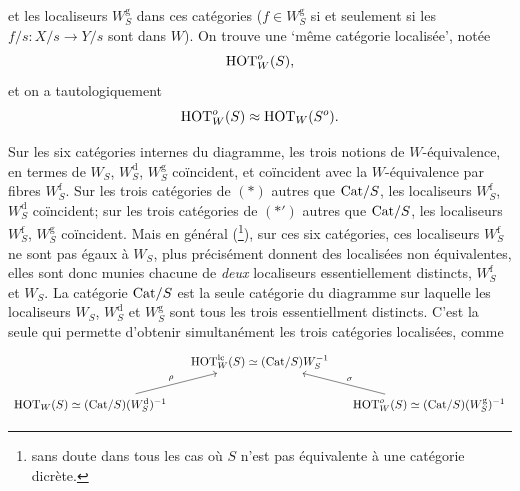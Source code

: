 \dgrchunkbegin

\setcounter{footnote}{45}

et les localiseurs $W_S^{\mathrm{g}}$ dans ces catégories ($f\in W_S^{\mathrm{g}}$ si et seulement si les $f/s : X/s\longrightarrow Y/s$ sont dans $W$). On trouve une `même catégorie localisée', notée
\[ \mathrm{HOT}^o_W(S), \]
et on a tautologiquement
\[ \mathrm{HOT}^o_W(S)\approx\mathrm{HOT}_W(S^o). \]


\quad Sur les six catégories internes du diagramme, les trois notions de $W$-équivalence, en termes de $W_S$, $W_S^{\mathrm{d}}$, $W_S^{\mathrm{g}}$ coïncident, et coïncident avec la $W$-équivalence par fibres $W_S^{\mathrm{f}}$. Sur les trois catégories de $(*)$ autres que $\mathrm{Cat}/S$, les localiseurs $W_S^{\mathrm{f}}$, $W_S^{\mathrm{d}}$ coïncident; sur les trois catégories de $(*')$ autres que $\mathrm{Cat}/S$, les localiseurs $W_S^{\mathrm{f}}$, $W_S^{\mathrm{g}}$ coïncident. Mais en général (\footnote{sans doute dans tous les cas où $S$ n'est pas équivalente à une catégorie dicrète.%
}), sur ces six catégories, ces localiseurs $W_S^{\mathrm{f}}$ ne sont pas égaux à $W_S$, plus précisément donnent des localisées non équivalentes, elles sont donc munies chacune de \textit{deux} localiseurs essentiellement distincts, $W_S^{\mathrm{f}}$ et $W_S$. La catégorie $\mathrm{Cat}/S$ est la seule catégorie du diagramme sur laquelle les localiseurs $W_S$, $W_S^{\mathrm{d}}$ et $W_S^{\mathrm{g}}$ sont tous les trois essentiellment distincts. %
C'est la seule qui permette d'obtenir simultanément les trois catégories localisées, comme
\[
\begin{tikzcd}[column sep=small]
 & \HOT^{\mathrm{lc}}_W(S)\simeq(\Cat/S)W_S^{-1} & \\
\HOT_W(S)\simeq(\Cat/S)(W_S^{\mathrm{d}})^{-1} \arrow[ur,"\rho"] & & \HOT^o_W(S)\simeq(\Cat/S)(W_S^{\mathrm{g}})^{-1} \arrow[ul,"\sigma"']
\end{tikzcd}
\]

